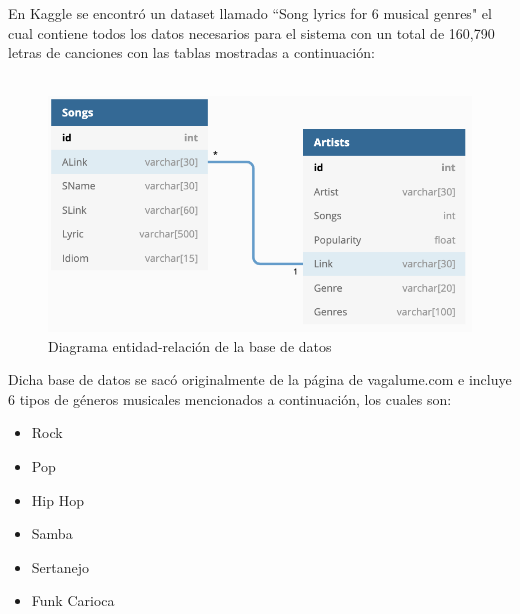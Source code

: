 \documentclass[12pt, a4paper, titlepage]{report}
\begin{document}
		En Kaggle \cite{kaggle} se encontró un dataset llamado “Song lyrics for 6 musical genres" \cite{kaggleDataset} el cual contiene todos los datos necesarios para el sistema con un total de 160,790 letras de canciones con las tablas mostradas a continuación:\\\\
		\begin{figure}[H]
			\includegraphics[width=12cm]{./imagenes/Disenio/Iteracion_1/Base_de_Datos/diagrama_ER_BD.jpg}
			\centering 
			\caption{Diagrama entidad-relación de la base de datos}
		\end{figure}
		Dicha base de datos se sacó originalmente de la página de vagalume.com \cite{vagalume} e incluye 6 tipos de géneros musicales mencionados a continuación, los cuales son:
		\begin{itemize}
			\item Rock
			\item Pop
			\item Hip Hop
			\item Samba
			\item Sertanejo
			\item Funk Carioca
		\end{itemize}
	
\end{document}

